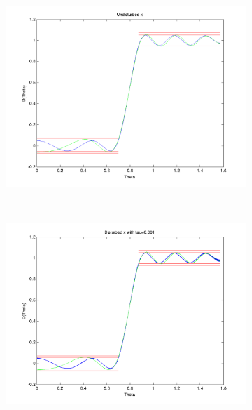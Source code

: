 \begin{figure}[h!]
  \centering
  \begin{subfigure}[b]{0.32\textwidth}
  \includegraphics[width=\textwidth]{D-ModRobustCon.png}
  \end{subfigure}
  ~ 
 \begin{subfigure}[b]{0.32\textwidth}
  \includegraphics[width=\textwidth]{D-ModRobustCon-tau0001.png}
  \end{subfigure}
  ~ 
  \begin{subfigure}[b]{0.32\textwidth}

\end{subfigure}
\end{figure}
